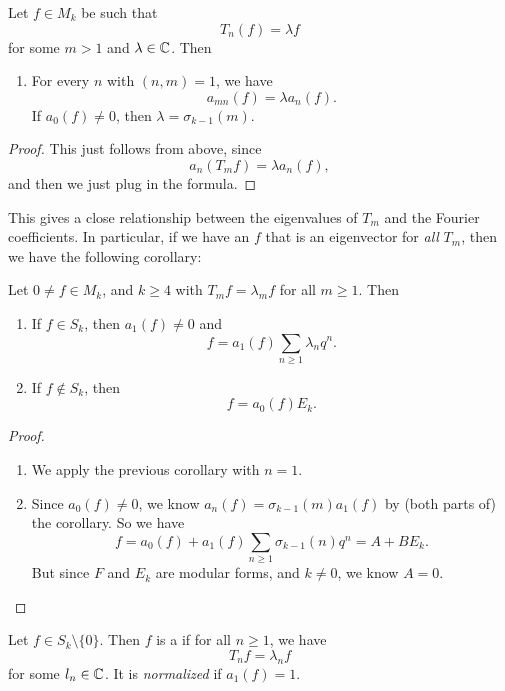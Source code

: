 \documentclass[a4paper]{article}
\begin{document}
\begin{cor}
  Let $f \in M_k$ be such that
  \[
    T_n(f) = \lambda f
  \]
  for some $m > 1$ and $\lambda \in \mathbb{C}$. Then
  \begin{enumerate}
    \item For every $n$ with $(n, m) = 1$, we have
      \[
        a_{mn}(f) = \lambda a_n(f).
      \]
      If $a_0(f) \not= 0$, then $\lambda = \sigma_{k - 1}(m)$.
  \end{enumerate}
\end{cor}

\begin{proof}
  This just follows from above, since
  \[
    a_n(T_m f) = \lambda a_n(f),
  \]
  and then we just plug in the formula.
\end{proof}
This gives a close relationship between the eigenvalues of $T_m$ and the Fourier coefficients. In particular, if we have an $f$ that is an eigenvector for \emph{all} $T_m$, then we have the following corollary:
\begin{cor}
  Let $0 \not= f \in M_k$, and $k \geq 4$ with $T_m f = \lambda_m f$ for all $m \geq 1$. Then
  \begin{enumerate}
    \item If $f \in S_k$, then $a_1(f) \not= 0$ and
      \[
        f = a_1(f) \sum_{n \geq 1} \lambda_n q^n.
      \]
    \item If $f \not \in S_k$, then
      \[
        f = a_0 (f) E_k.
      \]
  \end{enumerate}
\end{cor}

\begin{proof}\leavevmode
  \begin{enumerate}
    \item We apply the previous corollary with $n = 1$.
    \item Since $a_0(f) \not= 0$, we know $a_n(f) = \sigma_{k - 1}(m) a_1(f)$ by (both parts of) the corollary. So we have
      \[
        f = a_0(f) + a_1(f) \sum_{n \geq 1} \sigma_{k - 1}(n) q^n = A + B E_k.
      \]
      But since $F$ and $E_k$ are modular forms, and $k \not= 0$, we know $A = 0$.\qedhere
  \end{enumerate}
\end{proof}

\begin{defi}
  Let $f \in S_k \setminus \{0\}$. Then $f$ is a  if for all $n \geq 1$, we have
  \[
    T_n f = \lambda_n f
  \]
  for some $l_n \in \mathbb{C}$. It is \emph{normalized} if $a_1(f) = 1$.
\end{defi}
\end{document}
